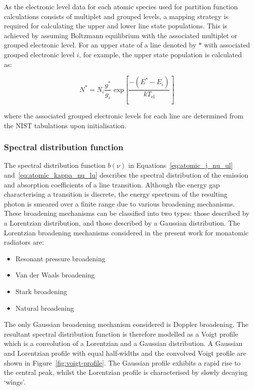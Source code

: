 \par

As the electronic level data for each atomic species used for partition function calculations consists of multiplet and grouped levels, a mapping strategy is required for calculating the upper and lower line state populations.
This is achieved by assuming Boltzmann equilibrium with the associated multiplet or grouped electronic level.
For an upper state of a line denoted by $\ast$ with associated grouped electronic level $i$, for example, the upper state population is calculated as:

\begin{equation}
 N^\ast = N_i \frac{g^\ast}{g_i} \text{~exp} \left [ \frac{- ( E^\ast - E_i ) }{kT_\text{el}} \right ]
\end{equation}

\noindent where the associated grouped electronic levels for each line are determined from the NIST tabulations upon initialisation.

\subsubsection{Spectral distribution function}

The spectral distribution function $b(\nu)$ in Equations~\ref{eq:atomic_j_nu_ul} and~\ref{eq:atomic_kappa_nu_lu} describes the spectral distribution of the emission and absorption coefficients of a line transition. 
Although the energy gap characterising a transition is discrete, the energy spectrum of the resulting photon is smeared over a finite range due to various broadening mechanisms.
These broadening mechanisms can be classified into two types: those described by a Lorentzian distribution, and those described by a Gaussian distribution. 
The Lorentzian broadening mechanisms considered in the present work for monatomic radiators are:

\begin{itemize}
 \item Resonant pressure broadening
 \item Van der Waals broadening
 \item Stark broadening
 \item Natural broadening
\end{itemize}

\noindent The only Gaussian broadening mechanism considered is Doppler broadening.
The resultant spectral distribution function is therefore modelled as a Voigt profile which is a convolution of a Lorentzian and a Gaussian distribution.
A Gaussian and Lorentzian profile with equal half-widths and the convolved Voigt profile are shown in Figure~\ref{fig:voigt-profile}.
The Gaussian profile exhibits a rapid rise to the central peak, whilst the Lorentzian profile is characterised by slowly decaying `wings'.

